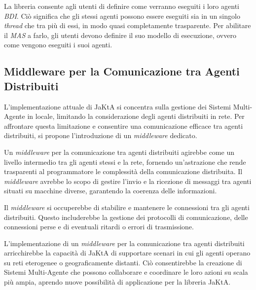 La libreria consente agli utenti di definire come verranno eseguiti i loro agenti \textit{BDI}. Ciò significa che gli stessi agenti possono essere eseguiti sia in un singolo \textit{thread} che tra più di essi, in modo quasi completamente trasparente. Per abilitare il \textit{MAS} a farlo, gli utenti devono definire il suo modello di esecuzione, ovvero come vengono eseguiti i suoi agenti.

\subsection{Middleware per la Comunicazione tra Agenti Distribuiti}

L'implementazione attuale di JaKtA si concentra sulla gestione dei Sistemi Multi-Agente in locale, limitando la considerazione degli agenti distribuiti in rete. Per affrontare questa limitazione e consentire una comunicazione efficace tra agenti distribuiti, si propone l'introduzione di un \textit{middleware} dedicato.

Un \textit{middleware} per la comunicazione tra agenti distribuiti agirebbe come un livello intermedio tra gli agenti stessi e la rete, fornendo un'astrazione che rende trasparenti al programmatore le complessità della comunicazione distribuita. Il \textit{middleware} avrebbe lo scopo di gestire l'invio e la ricezione di messaggi tra agenti situati su macchine diverse, garantendo la coerenza delle informazioni.

Il \textit{middleware} si occuperebbe di stabilire e mantenere le connessioni tra gli agenti distribuiti. Questo includerebbe la gestione dei protocolli di comunicazione, delle connessioni perse e di eventuali ritardi o errori di trasmissione.

L'implementazione di un \textit{middleware} per la comunicazione tra agenti distribuiti arricchirebbe la capacità di JaKtA di supportare scenari in cui gli agenti operano su reti eterogenee o geograficamente distanti. Ciò consentirebbe la creazione di Sistemi Multi-Agente che possono collaborare e coordinare le loro azioni su scala più ampia, aprendo nuove possibilità di applicazione per la libreria JaKtA.